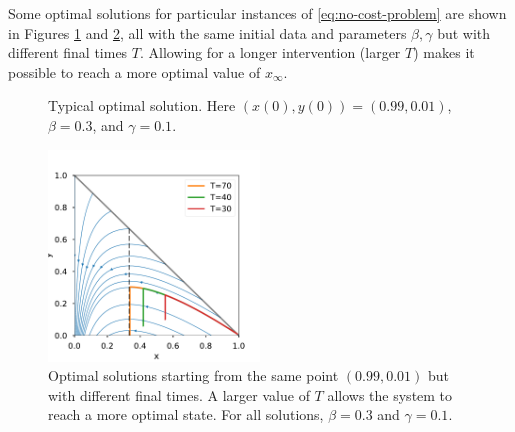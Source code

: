 \documentclass[english,12pt,letter]{article}
\newcommand{\Sinf}{x_\infty}
\begin{document}
Some optimal solutions for particular instances of \eqref{eq:no-cost-problem}
are shown in Figures \ref{fig:example1} and \ref{fig:diff-time-opt},
all with the same initial data and parameters $\beta, \gamma$ but with different final
times $T$.  Allowing for a longer intervention (larger $T$) makes it possible to reach
a more optimal value of $\Sinf$.

\begin{figure}
    \centering
    \caption{Typical optimal solution.  Here $(x(0),y(0)) = (0.99,0.01)$, $\beta=0.3$, and $\gamma=0.1$.\label{fig:example1}}
\end{figure}

\begin{figure}
    \centering
    \includegraphics[width=0.5\textwidth]{figures/diff-time-opt.pdf}
    \caption{Optimal solutions starting from the same point $(0.99,0.01)$ but with different
        final times.  A larger value of $T$ allows the system to reach a more optimal state.
        For all solutions, $\beta=0.3$ and $\gamma=0.1$.\label{fig:diff-time-opt}}
\end{figure}
\end{document}
